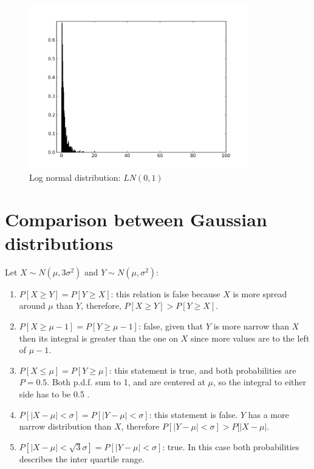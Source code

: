 \documentclass[10pt]{article}
\begin{document}
\begin{figure}[H]
    \centering
    \includegraphics[width=0.85\textwidth]{../fig3.png}
    \caption{Log normal distribution: $LN(0,1)$}
    \label{fig:fig3}
\end{figure}

\section{Comparison between Gaussian distributions}
Let $X \sim N(\mu,3\sigma^2)$ and $Y \sim N(\mu,\sigma^2)$:
\begin{enumerate}
    \item $P[X \geq Y]=P[Y\geq X]$: this relation is false because
          $X$ is more spread around $\mu$ than $Y$, therefore, $P[X \geq Y]>P[Y\geq X]$.
    \item $P[X\geq \mu -1] = P[Y\geq \mu -1]$: false, given that $Y$ is more narrow than $X$
          then its integral is greater than  the one on $X$ since more values are to the left
          of $\mu -1$. 
    \item $P[X \leq \mu]=P[Y \geq \mu]$: this statement is true, and both probabilities are
          $P=0.5$. Both p.d.f. sum to 1, and are centered at $\mu$, so the integral to either
          side has to be 0.5 .
    \item $P[ \left|X-\mu \right| <\sigma]= P[\left|Y-\mu\right|<\sigma]$: this statement
          is false. $Y$ has a more narrow distribution than $X$, therefore 
          $P[\left|Y-\mu\right|<\sigma] > P[ \left|X-\mu \right|$.
    \item $P[ \left|X-\mu \right| <\sqrt{3}\sigma]= P[\left|Y-\mu\right|<\sigma]$: true. In 
          this case both probabilities describes the inter quartile range. 
\end{enumerate}
\end{document}
